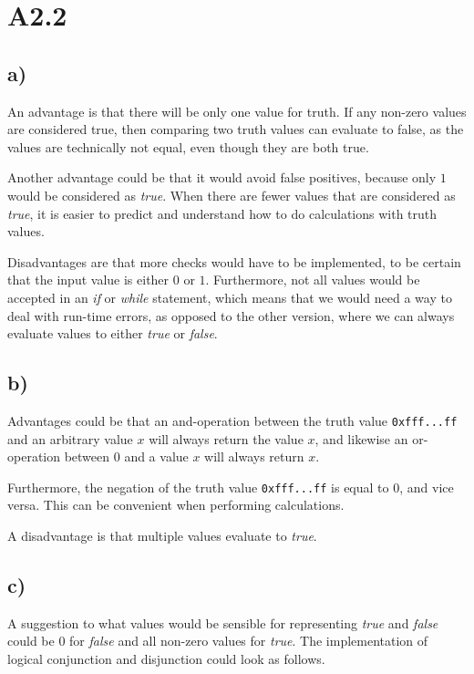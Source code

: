 \section*{A2.2}

\subsection*{a)}
An advantage is that there will be only one value for truth. If any non-zero values are considered true, then comparing two truth values can evaluate to false, as the values are technically not equal, even though they are both true. 

Another advantage could be that it would avoid false positives, because only $1$ would be considered as \textit{true}. When there are fewer values that are considered as \textit{true}, it is easier to predict and understand how to do calculations with truth values.

Disadvantages are that more checks would have to be implemented, to be certain that the input value is either $0$ or $1$. Furthermore, not all values would be accepted in an \textit{if} or \textit{while} statement, which means that we would need a way to deal with run-time errors, as opposed to the other version, where we can always evaluate values to either \textit{true} or \textit{false}.

\subsection*{b)}
Advantages could be that an and-operation between the truth value \texttt{0xfff...ff} and an arbitrary value $x$ will always return the value $x$, and likewise an or-operation between $0$ and a value $x$ will always return $x$.

Furthermore, the negation of the truth value \texttt{0xfff...ff} is equal to $0$, and vice versa. This can be convenient when performing calculations.

A disadvantage is that multiple values evaluate to \textit{true}.

\subsection*{c)}
A suggestion to what values would be sensible for representing \textit{true} and \textit{false} could be $0$ for \textit{false} and all non-zero values for \textit{true}. The implementation of logical conjunction and disjunction could look as follows.

